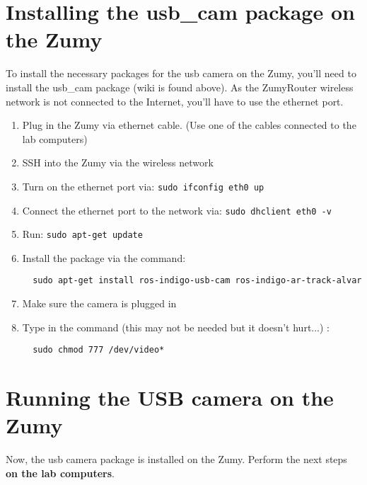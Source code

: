 \documentclass[10pt]{article}
\begin{document}
\section{Installing the usb\_cam package on the Zumy}
To install the necessary packages for the usb camera on the Zumy, you'll need to install the usb\_cam package (wiki is found above).  
As the ZumyRouter wireless network is not connected to the Internet, you'll have to use the ethernet port.

\begin{enumerate}
  \item Plug in the Zumy via ethernet cable.  (Use one of the cables connected to the lab computers)
  \item SSH into the Zumy via the wireless network
  \item Turn on the ethernet port via: \verb=sudo ifconfig eth0 up=
  \item Connect the ethernet port to the network via: \verb=sudo dhclient eth0 -v= 
  \item Run: \verb=sudo apt-get update=
  \item Install the package via the command:
  \begin{verbatim}
  sudo apt-get install ros-indigo-usb-cam ros-indigo-ar-track-alvar
  \end{verbatim}
  \item Make sure the camera is plugged in
  \item Type in the command (this may not be needed but it doesn't hurt...) :
  \begin{verbatim}
  sudo chmod 777 /dev/video*
  \end{verbatim}
\end{enumerate}

\section{Running the USB camera on the Zumy}\label{sec:usb_cam}

Now, the usb camera package is installed on the Zumy.  Perform the next steps \textbf{on the lab computers}.
\end{document}

